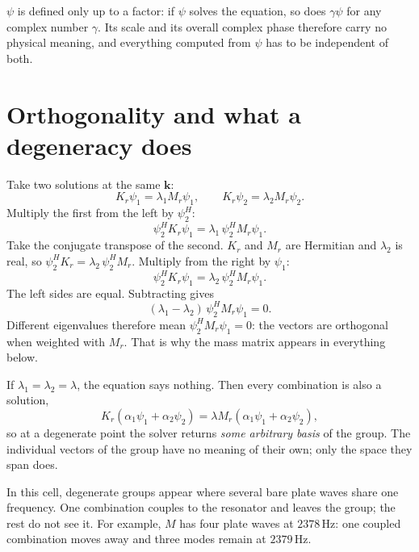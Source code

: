 $\psi$ is defined only up to a factor: if $\psi$ solves the equation, so does
$\gamma\psi$ for any complex number $\gamma$. Its scale and its overall complex
phase therefore carry no physical meaning, and everything computed from $\psi$ has
to be independent of both.

\section{Orthogonality and what a degeneracy does}
\label{sec:orthogonality}

Take two solutions at the same $\mathbf{k}$:
\begin{equation}
  K_r \psi_1 = \lambda_1 M_r \psi_1, \qquad K_r \psi_2 = \lambda_2 M_r \psi_2 .
\end{equation}
Multiply the first from the left by $\psi_2^H$:
\begin{equation}
  \psi_2^H K_r \psi_1 = \lambda_1\, \psi_2^H M_r \psi_1 .
\end{equation}
Take the conjugate transpose of the second. $K_r$ and $M_r$ are Hermitian and
$\lambda_2$ is real, so $\psi_2^H K_r = \lambda_2\, \psi_2^H M_r$. Multiply from the
right by $\psi_1$:
\begin{equation}
  \psi_2^H K_r \psi_1 = \lambda_2\, \psi_2^H M_r \psi_1 .
\end{equation}
The left sides are equal. Subtracting gives
\begin{equation}
  (\lambda_1 - \lambda_2)\, \psi_2^H M_r \psi_1 = 0 .
\end{equation}
Different eigenvalues therefore mean $\psi_2^H M_r \psi_1 = 0$: the vectors are
orthogonal when weighted with $M_r$. That is why the mass matrix appears in
everything below.

If $\lambda_1 = \lambda_2 = \lambda$, the equation says nothing. Then every
combination is also a solution,
\begin{equation}
  K_r(\alpha_1\psi_1 + \alpha_2\psi_2) = \lambda M_r(\alpha_1\psi_1 + \alpha_2\psi_2),
\end{equation}
so at a degenerate point the solver returns \emph{some arbitrary basis} of the
group. The individual vectors of the group have no meaning of their own; only the
space they span does.

In this cell, degenerate groups appear where several bare plate waves share one
frequency. One combination couples to the resonator and leaves the group; the rest
do not see it. For example, $M$ has four plate waves at $2378\,\mathrm{Hz}$: one
coupled combination moves away and three modes remain at $2379\,\mathrm{Hz}$.

